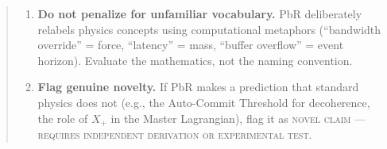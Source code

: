 \documentclass[12pt, a4paper]{article}
\begin{document}
\begin{quote}
\begin{enumerate}
    \item \textbf{Do not penalize for unfamiliar vocabulary.} PbR deliberately relabels physics concepts using computational metaphors (``bandwidth override'' = force, ``latency'' = mass, ``buffer overflow'' = event horizon). Evaluate the mathematics, not the naming convention.

    \item \textbf{Flag genuine novelty.} If PbR makes a prediction that standard physics does not (e.g., the Auto-Commit Threshold for decoherence, the role of $X_+$ in the Master Lagrangian), flag it as \textsc{novel claim --- requires independent derivation or experimental test}.
\end{enumerate}
\end{quote}
\end{document}
